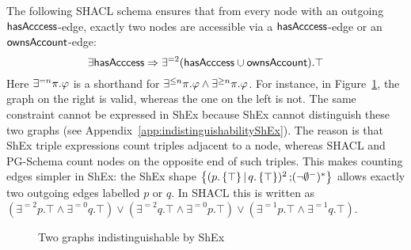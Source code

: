 \begin{example}%
\label{ex:shex-counts-edges}
    The following SHACL schema ensures that from every node with an outgoing $\mathsf{hasAcccess}$-edge, exactly two nodes are accessible via a $\mathsf{hasAcccess}$-edge or an $\mathsf{ownsAccount}$-edge:
    \[
    \exists \mathsf{hasAcccess} \Rightarrow \exists^{= 2} (\mathsf{hasAcccess} \cup
    \mathsf{ownsAccount}).\top
    \]
    Here $\exists^{=n} \pi.\varphi$ is a shorthand for $\exists^{\leq n} \pi.\varphi \land \exists^{\geq n} \pi.\varphi$.
    For instance, in Figure~\ref{fig:example-shex-counts-edges}, the graph on the right is valid, whereas the one on the left is not.
    The same constraint cannot be expressed in ShEx because ShEx cannot distinguish these two graphs (see Appendix~\ref{app:indistinguishabilityShEx}).
    The reason is that ShEx triple expressions count triples adjacent to a node, whereas SHACL and PG-Schema count nodes on the opposite end of such triples.
    This makes counting edges simpler in ShEx: the ShEx shape $\left\{ (p. \left\{ \top \right\} \mathop{|} q.\left\{ \top \right\})^{2} \mathop{;} (\neg{\emptyset^{-}})^{*} \right\}$ allows exactly two outgoing edges labelled $p$ or $q$. In SHACL this is written as $(\exists^{=2} p. \top \land \exists^{=0} q.\top) \lor (\exists^{=2} q.\top \land \exists^{=0} p.\top) \lor (\exists^{=1} p.\top \wedge \exists^{=1} q.\top)$.
\end{example}

\begin{figure}[t]
\caption{Two graphs indistinguishable by ShEx}
\label{fig:example-shex-counts-edges}
\end{figure}



